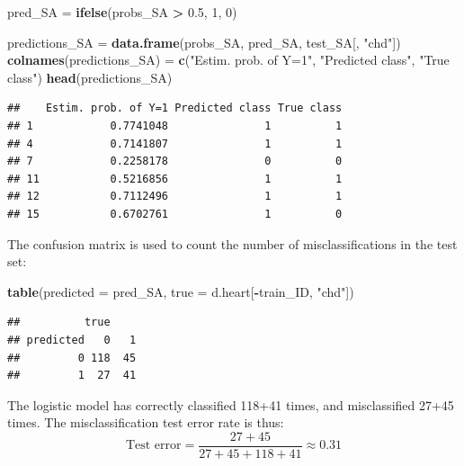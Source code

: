 \documentclass[10pt,ignorenonframetext,]{beamer}
\newenvironment{Shaded}{\begin{snugshade}}{\end{snugshade}}
\newcommand{\KeywordTok}[1]{\textcolor[rgb]{0.13,0.29,0.53}{\textbf{#1}}}
\newcommand{\DataTypeTok}[1]{\textcolor[rgb]{0.13,0.29,0.53}{#1}}
\newcommand{\DecValTok}[1]{\textcolor[rgb]{0.00,0.00,0.81}{#1}}
\newcommand{\FloatTok}[1]{\textcolor[rgb]{0.00,0.00,0.81}{#1}}
\newcommand{\StringTok}[1]{\textcolor[rgb]{0.31,0.60,0.02}{#1}}
\newcommand{\OperatorTok}[1]{\textcolor[rgb]{0.81,0.36,0.00}{\textbf{#1}}}
\newcommand{\NormalTok}[1]{#1}
\begin{document}
\begin{frame}[fragile]

\scriptsize

\begin{Shaded}
\begin{Highlighting}[]
\NormalTok{pred_SA =}\StringTok{ }\KeywordTok{ifelse}\NormalTok{(probs_SA }\OperatorTok{>}\StringTok{ }\FloatTok{0.5}\NormalTok{, }\DecValTok{1}\NormalTok{, }\DecValTok{0}\NormalTok{)}

\NormalTok{predictions_SA =}\StringTok{ }\KeywordTok{data.frame}\NormalTok{(probs_SA, pred_SA, test_SA[, }\StringTok{"chd"}\NormalTok{])}
\KeywordTok{colnames}\NormalTok{(predictions_SA) =}\StringTok{ }\KeywordTok{c}\NormalTok{(}\StringTok{"Estim. prob. of Y=1"}\NormalTok{, }\StringTok{"Predicted class"}\NormalTok{, }
    \StringTok{"True class"}\NormalTok{)}
\KeywordTok{head}\NormalTok{(predictions_SA)}
\end{Highlighting}
\end{Shaded}

\begin{verbatim}
##    Estim. prob. of Y=1 Predicted class True class
## 1            0.7741048               1          1
## 4            0.7141807               1          1
## 7            0.2258178               0          0
## 11           0.5216856               1          1
## 12           0.7112496               1          1
## 15           0.6702761               1          0
\end{verbatim}

\end{frame}

\begin{frame}[fragile]

The confusion matrix is used to count the number of misclassifications
in the test set:

\scriptsize

\begin{Shaded}
\begin{Highlighting}[]
\KeywordTok{table}\NormalTok{(}\DataTypeTok{predicted =}\NormalTok{ pred_SA, }\DataTypeTok{true =}\NormalTok{ d.heart[}\OperatorTok{-}\NormalTok{train_ID, }\StringTok{"chd"}\NormalTok{])}
\end{Highlighting}
\end{Shaded}

\begin{verbatim}
##          true
## predicted   0   1
##         0 118  45
##         1  27  41
\end{verbatim}

\normalsize
The logistic model has correctly classified 118+41 times, and
misclassified 27+45 times. The misclassification test error rate is
thus: \[\text{Test error} = \frac{27+45}{27+45+118+41} \approx 0.31\]

\end{frame}
\end{document}
